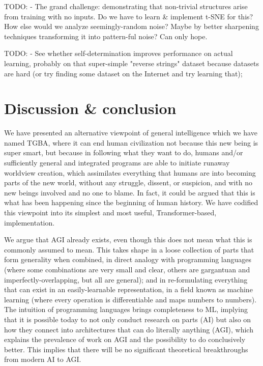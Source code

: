 \documentclass{article}
\begin{document}
    TODO: - The grand challenge: demonstrating that non-trivial structures arise from training with no inputs. Do we have to learn & implement t-SNE for this? How else would we analyze seemingly-random noise? Maybe by better sharpening techniques transforming it into pattern-ful noise? Can only hope.

    TODO: - See whether self-determination improves performance on actual learning, probably on that super-simple "reverse strings" dataset because datasets are hard (or try finding some dataset on the Internet and try learning that);

\section{Discussion & conclusion}

We have presented an alternative viewpoint of general intelligence which we have named TGBA, where it can end human civilization not because this new being is super smart, but because in following what they want to do, humans and/or sufficiently general and integrated programs are able to initiate runaway worldview creation, which assimilates everything that humans are into becoming parts of the new world, without any struggle, dissent, or suspicion, and with no new beings involved and no one to blame. In fact, it could be argued that this is what has been happening since the beginning of human history. We have codified this viewpoint into its simplest and most useful, Transformer-based, implementation.

We argue that AGI already exists, even though this does not mean what this is commonly assumed to mean. This takes shape in a loose collection of parts that form generality when combined, in direct analogy with programming languages (where some combinations are very small and clear, others are gargantuan and imperfectly-overlapping, but all are general); and in re-formulating everything that can exist in an easily-learnable representation, in a field known as machine learning (where every operation is differentiable and maps numbers to numbers). The intuition of programming languages brings completeness to ML, implying that it is possible today to not only conduct research on parts (AI) but also on how they connect into architectures that can do literally anything (AGI), which explains the prevalence of work on AGI and the possibility to do conclusively better. This implies that there will be no significant theoretical breakthroughs from modern AI to AGI.
\end{document}
